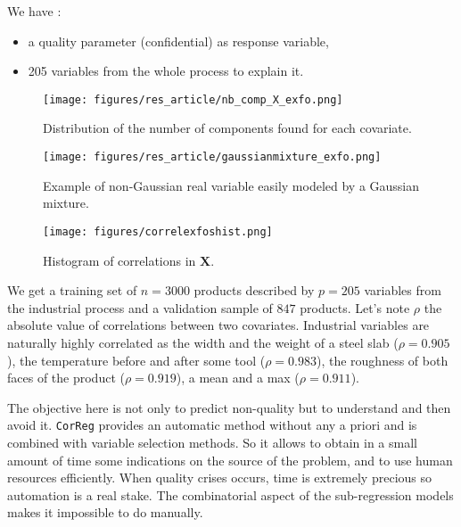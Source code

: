 \documentclass[12pt,a4paper]{report}
\begin{document}
We have :
		\begin{itemize}
			\item a quality parameter (confidential) as response variable,
			\item 205 variables from the whole process to explain it.
		\end{itemize}

\begin{figure}[h!]
	\begin{minipage}[t]{.30\linewidth}
			\texttt{[image: figures/res\_article/nb\_comp\_X\_exfo.png]}%
			\caption{Distribution of the number of components found for each covariate.}\label{graphMixmod}
	\end{minipage} \hfill
	\begin{minipage}[t]{.30\linewidth}
			\texttt{[image: figures/res\_article/gaussianmixture\_exfo.png]}%
			\caption{Example of non-Gaussian real variable easily modeled by a Gaussian mixture.}
	\end{minipage} \hfill
   \begin{minipage}[t]{.30\linewidth}
			\texttt{[image: figures/correlexfoshist.png]} 
			\caption{Histogram of correlations in $\boldsymbol{X}$.} \label{compareMSEexfos}
   \end{minipage}
\end{figure}   			
	We get a training set of $n=3 000$ products described by $p=205$ variables from the industrial process and a validation sample of $847$ products.
	Let's note $\rho$ the absolute value of correlations between two covariates. Industrial variables are naturally highly correlated as the width and the weight of a steel slab ($\rho=0.905$), the temperature before and after some tool ($\rho=0.983$), the  roughness of both faces of the product ($\rho= 0.919$), a mean and a max ($\rho=0.911$). 
	
	The objective here is not only to predict non-quality but to understand and then avoid it. {\tt CorReg} provides an automatic method without any a priori and is combined with variable selection methods. So it allows to obtain in a small amount of time some indications on the source of the problem, and to use human resources efficiently. When quality crises occurs, time is extremely precious so automation is a real stake. The combinatorial aspect of the sub-regression models makes it impossible to do manually.
		
\end{document}
